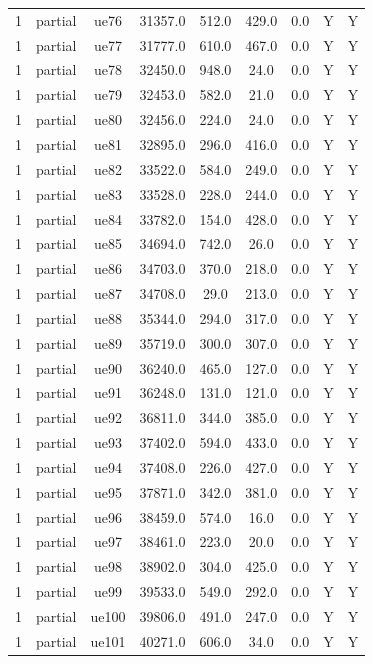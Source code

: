 \begin{table}[ht]
\begin{tabular}{|c|c|c|c|c|c|c|c|c|}
1 & partial & ue76 & 31357.0 & 512.0 & 429.0 & 0.0 & Y & Y \\
1 & partial & ue77 & 31777.0 & 610.0 & 467.0 & 0.0 & Y & Y \\
1 & partial & ue78 & 32450.0 & 948.0 & 24.0 & 0.0 & Y & Y \\
1 & partial & ue79 & 32453.0 & 582.0 & 21.0 & 0.0 & Y & Y \\
1 & partial & ue80 & 32456.0 & 224.0 & 24.0 & 0.0 & Y & Y \\
1 & partial & ue81 & 32895.0 & 296.0 & 416.0 & 0.0 & Y & Y \\
1 & partial & ue82 & 33522.0 & 584.0 & 249.0 & 0.0 & Y & Y \\
1 & partial & ue83 & 33528.0 & 228.0 & 244.0 & 0.0 & Y & Y \\
1 & partial & ue84 & 33782.0 & 154.0 & 428.0 & 0.0 & Y & Y \\
1 & partial & ue85 & 34694.0 & 742.0 & 26.0 & 0.0 & Y & Y \\
1 & partial & ue86 & 34703.0 & 370.0 & 218.0 & 0.0 & Y & Y \\
1 & partial & ue87 & 34708.0 & 29.0 & 213.0 & 0.0 & Y & Y \\
1 & partial & ue88 & 35344.0 & 294.0 & 317.0 & 0.0 & Y & Y \\
1 & partial & ue89 & 35719.0 & 300.0 & 307.0 & 0.0 & Y & Y \\
1 & partial & ue90 & 36240.0 & 465.0 & 127.0 & 0.0 & Y & Y \\
1 & partial & ue91 & 36248.0 & 131.0 & 121.0 & 0.0 & Y & Y \\
1 & partial & ue92 & 36811.0 & 344.0 & 385.0 & 0.0 & Y & Y \\
1 & partial & ue93 & 37402.0 & 594.0 & 433.0 & 0.0 & Y & Y \\
1 & partial & ue94 & 37408.0 & 226.0 & 427.0 & 0.0 & Y & Y \\
1 & partial & ue95 & 37871.0 & 342.0 & 381.0 & 0.0 & Y & Y \\
1 & partial & ue96 & 38459.0 & 574.0 & 16.0 & 0.0 & Y & Y \\
1 & partial & ue97 & 38461.0 & 223.0 & 20.0 & 0.0 & Y & Y \\
1 & partial & ue98 & 38902.0 & 304.0 & 425.0 & 0.0 & Y & Y \\
1 & partial & ue99 & 39533.0 & 549.0 & 292.0 & 0.0 & Y & Y \\
1 & partial & ue100 & 39806.0 & 491.0 & 247.0 & 0.0 & Y & Y \\
1 & partial & ue101 & 40271.0 & 606.0 & 34.0 & 0.0 & Y & Y \\

\end{tabular}
\end{table}
